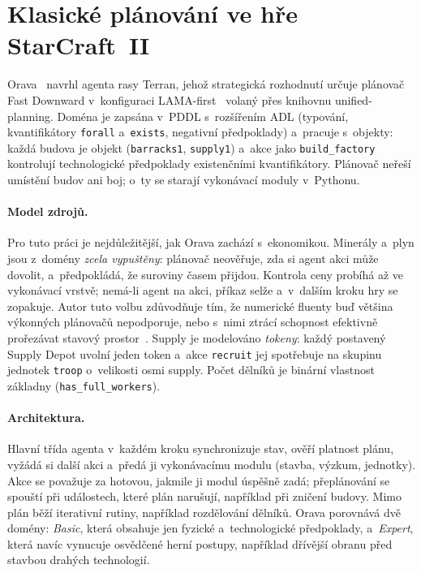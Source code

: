 \section{Klasické plánování ve hře StarCraft~II}
\label{sec:orava}

Orava~\cite{Orava2025} navrhl agenta rasy Terran, jehož strategická rozhodnutí určuje plánovač Fast Downward v~konfiguraci LAMA-first~\cite{Helmert2006,Richter2010} volaný přes knihovnu unified-planning. Doména je zapsána v~PDDL s~rozšířením ADL (typování, kvantifikátory \texttt{forall} a~\texttt{exists}, negativní předpoklady) a~pracuje s~objekty: každá budova je objekt (\texttt{barracks1}, \texttt{supply1}) a~akce jako \texttt{build\_factory} kontrolují technologické předpoklady existenčními kvantifikátory. Plánovač neřeší umístění budov ani boj; o~ty se starají vykonávací moduly v~Pythonu.

\paragraph{Model zdrojů.} Pro tuto práci je nejdůležitější, jak Orava zachází s~ekonomikou. Minerály a~plyn jsou z~domény \emph{zcela vypuštěny}: plánovač neověřuje, zda si agent akci může dovolit, a~předpokládá, že suroviny časem přijdou. Kontrola ceny probíhá až ve vykonávací vrstvě; nemá-li agent na akci, příkaz selže a~v~dalším kroku hry se zopakuje. Autor tuto volbu zdůvodňuje tím, že numerické fluenty buď většina výkonných plánovačů nepodporuje, nebo s~nimi ztrácí schopnost efektivně prořezávat stavový prostor~\cite[kap.~5.3]{Orava2025}. Supply je modelováno \emph{tokeny}: každý postavený Supply Depot uvolní jeden token a~akce \texttt{recruit} jej spotřebuje na skupinu jednotek \texttt{troop} o~velikosti osmi supply. Počet dělníků je binární vlastnost základny (\texttt{has\_full\_workers}).

\paragraph{Architektura.} Hlavní třída agenta v~každém kroku synchronizuje stav, ověří platnost plánu, vyžádá si další akci a~předá ji vykonávacímu modulu (stavba, výzkum, jednotky). Akce se považuje za hotovou, jakmile ji modul úspěšně zadá; přeplánování se spouští při událostech, které plán narušují, například při zničení budovy. Mimo plán běží iterativní rutiny, například rozdělování dělníků. Orava porovnává dvě domény: \emph{Basic}, která obsahuje jen fyzické a~technologické předpoklady, a~\emph{Expert}, která navíc vynucuje osvědčené herní postupy, například dřívější obranu před stavbou drahých technologií.

